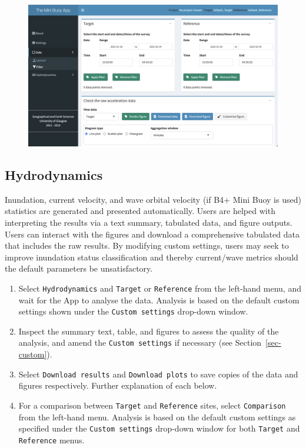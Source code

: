 \documentclass[
  letterpaper,
  DIV=11,
  numbers=noendperiod]{scrreprt}
\providecommand{\tightlist}{%
  \setlength{\itemsep}{0pt}\setlength{\parskip}{0pt}}\usepackage{longtable,booktabs,array}
\begin{document}
\begin{figure}

{\centering \includegraphics[width=1\textwidth,height=\textheight]{chapters/figs/DataFilter.png}

}

\end{figure}

\hypertarget{hydrodynamics}{%
\subsection{Hydrodynamics}\label{hydrodynamics}}

Inundation, current velocity, and wave orbital velocity (if B4+ Mini
Buoy is used) statistics are generated and presented automatically.
Users are helped with interpreting the results via a text summary,
tabulated data, and figure outputs. Users can interact with the figures
and download a comprehensive tabulated data that includes the raw
results. By modifying custom settings, users may seek to improve
inundation status classification and thereby current/wave metrics should
the default parameters be unsatisfactory.

\begin{enumerate}
\def\labelenumi{\arabic{enumi}.}
\tightlist
\item
  Select \texttt{Hydrodynamics} and \texttt{Target} or
  \texttt{Reference} from the left-hand menu, and wait for the App to
  analyse the data. Analysis is based on the default custom settings
  shown under the \texttt{Custom\ settings} drop-down window.
\item
  Inspect the summary text, table, and figures to assess the quality of
  the analysis, and amend the \texttt{Custom\ settings} if necessary
  (see Section~\ref{sec-custom}).
\item
  Select \texttt{Download\ results} and \texttt{Download\ plots} to save
  copies of the data and figures respectively. Further explanation of
  each below.
\item
  For a comparison between \texttt{Target} and \texttt{Reference} sites,
  select \texttt{Comparison} from the left-hand menu. Analysis is based
  on the default custom settings as specified under the
  \texttt{Custom\ settings} drop-down window for both \texttt{Target}
  and \texttt{Reference} menus.
\end{enumerate}
\end{document}
